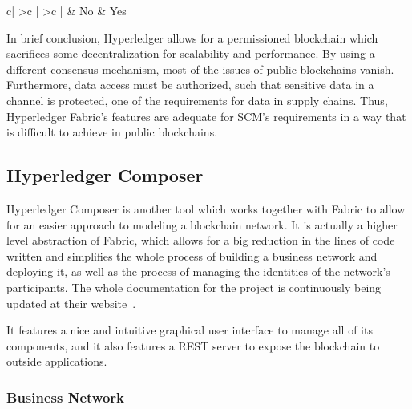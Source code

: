 \begin{table}[]
{\begin{tabular}{c|
>{}c |
>{}c |}
              & {\color[HTML]{000000} No}                                                                                                                                                  & {\color[HTML]{000000} Yes}                                                                                                                                                                    \\ \hline
\end{tabular}
}
\end{table}





In brief conclusion, Hyperledger allows for a permissioned blockchain which sacrifices some decentralization for scalability and performance. By using a different consensus mechanism, most of the issues of public blockchains vanish. Furthermore, data access must be authorized, such that sensitive data in a channel is protected, one of the requirements for data in supply chains. Thus, Hyperledger Fabric's features are adequate for SCM's requirements in a way that is difficult to achieve in public blockchains.

\subsection{Hyperledger Composer}
\label{sec:composer-background}
Hyperledger Composer is another tool which works together with Fabric to allow for an easier approach to modeling a blockchain network. It is actually a higher level abstraction of Fabric, which allows for a big reduction in the lines of code written and simplifies the whole process of building a business network and deploying it, as well as the process of managing the identities of the network's participants. The whole documentation for the project is continuously being updated at their website~\cite{LinuxFoundation2018}.

It features a nice and intuitive graphical user interface to manage all of its components, and it also features a REST server to expose the blockchain to outside applications.

\subsubsection{Business Network}

